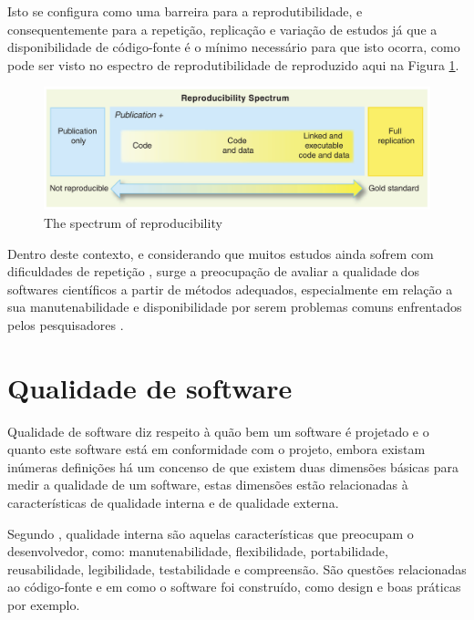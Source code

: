 \documentclass[qual, classic, a4paper]{ufbathesis}
\begin{document}
Isto se configura como uma barreira para a reprodutibilidade, e
consequentemente para a repetição, replicação e variação de estudos
\cite{Feitelson2015} já que a disponibilidade de código-fonte é o mínimo
necessário para que isto ocorra, como pode ser visto no espectro de
reprodutibilidade de  reproduzido aqui na Figura
\ref{reproducibility-spectrum}.

\begin{figure}[h]
  \center
  \includegraphics[scale=0.25]{imagens/reproducibility-spectrum.png}
  \caption{The spectrum of reproducibility\cite{Peng2011}}
  \label{reproducibility-spectrum}
\end{figure}

Dentro deste contexto, e considerando que muitos estudos ainda sofrem com
dificuldades de repetição \cite{Tang2016}, surge a preocupação de avaliar a
qualidade dos softwares científicos a partir de métodos adequados,
especialmente em relação a sua manutenabilidade e disponibilidade por serem
problemas comuns enfrentados pelos pesquisadores \cite{Prlic2012}.

\section{Qualidade de software}

Qualidade de software diz respeito à quão bem um software é projetado e o
quanto este software está em conformidade com o projeto, embora existam
inúmeras definições há um concenso de que existem duas dimensões básicas para medir a
qualidade de um software, estas dimensões estão relacionadas à características
de qualidade interna e de qualidade externa.

Segundo , qualidade interna são aquelas
características que preocupam o desenvolvedor, como: manutenabilidade,
flexibilidade, portabilidade, reusabilidade, legibilidade, testabilidade e
compreensão. São questões relacionadas ao código-fonte e em como o software
foi construído, como design e boas práticas por exemplo.
\end{document}
